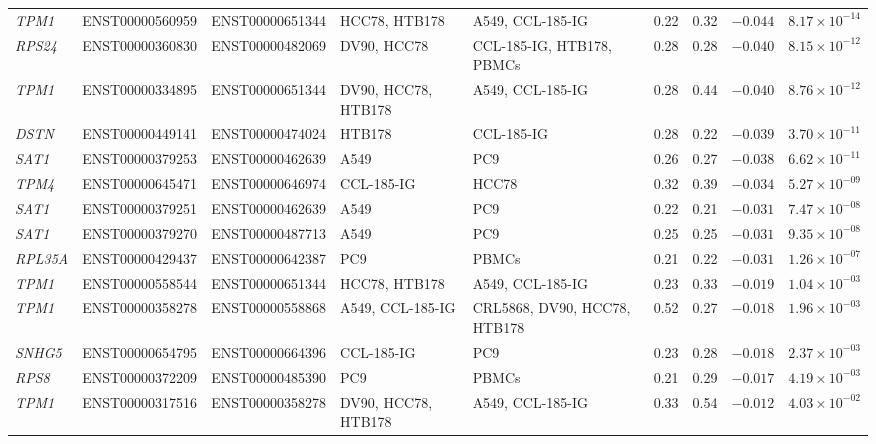 \begin{landscape}
\begin{longtable}{@{} l l l p{2.8cm} p{2.8cm} r r r r @{}}
\textit{TPM1}   & ENST00000560959 & ENST00000651344 & HCC78, HTB178 & A549, CCL-185-IG & 0.22 & 0.32 & $-0.044$ & $8.17 \times 10^{-14}$ \\
\textit{RPS24}  & ENST00000360830 & ENST00000482069 & DV90, HCC78 & CCL-185-IG, HTB178, PBMCs & 0.28 & 0.28 & $-0.040$ & $8.15 \times 10^{-12}$ \\
\textit{TPM1}   & ENST00000334895 & ENST00000651344 & DV90, HCC78, HTB178 & A549, CCL-185-IG & 0.28 & 0.44 & $-0.040$ & $8.76 \times 10^{-12}$ \\
\textit{DSTN}   & ENST00000449141 & ENST00000474024 & HTB178 & CCL-185-IG & 0.28 & 0.22 & $-0.039$ & $3.70 \times 10^{-11}$ \\
\textit{SAT1}   & ENST00000379253 & ENST00000462639 & A549 & PC9 & 0.26 & 0.27 & $-0.038$ & $6.62 \times 10^{-11}$ \\
\textit{TPM4}   & ENST00000645471 & ENST00000646974 & CCL-185-IG & HCC78 & 0.32 & 0.39 & $-0.034$ & $5.27 \times 10^{-09}$ \\
\textit{SAT1}   & ENST00000379251 & ENST00000462639 & A549 & PC9 & 0.22 & 0.21 & $-0.031$ & $7.47 \times 10^{-08}$ \\
\textit{SAT1}   & ENST00000379270 & ENST00000487713 & A549 & PC9 & 0.25 & 0.25 & $-0.031$ & $9.35 \times 10^{-08}$ \\
\textit{RPL35A} & ENST00000429437 & ENST00000642387 & PC9 & PBMCs & 0.21 & 0.22 & $-0.031$ & $1.26 \times 10^{-07}$ \\
\textit{TPM1}   & ENST00000558544 & ENST00000651344 & HCC78, HTB178 & A549, CCL-185-IG & 0.23 & 0.33 & $-0.019$ & $1.04 \times 10^{-03}$ \\
\textit{TPM1}   & ENST00000358278 & ENST00000558868 & A549, CCL-185-IG & CRL5868, DV90, HCC78, HTB178 & 0.52 & 0.27 & $-0.018$ & $1.96 \times 10^{-03}$ \\
\textit{SNHG5}  & ENST00000654795 & ENST00000664396 & CCL-185-IG & PC9 & 0.23 & 0.28 & $-0.018$ & $2.37 \times 10^{-03}$ \\
\textit{RPS8}   & ENST00000372209 & ENST00000485390 & PC9 & PBMCs & 0.21 & 0.29 & $-0.017$ & $4.19 \times 10^{-03}$ \\
\textit{TPM1}   & ENST00000317516 & ENST00000358278 & DV90, HCC78, HTB178 & A549, CCL-185-IG & 0.33 & 0.54 & $-0.012$ & $4.03 \times 10^{-02}$ \\
\end{longtable}
\endgroup
\end{landscape}


